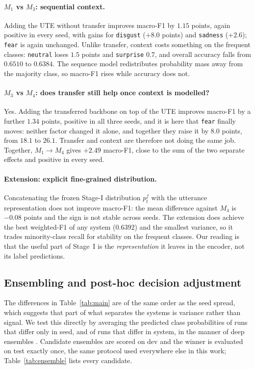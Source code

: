 \documentclass[sigconf,nonacm]{acmart}
\begin{document}
\paragraph{$M_1$ vs $M_3$: sequential context.}
Adding the UTE without transfer improves macro-F1 by $1.15$ points, again positive in every
seed, with gains for \texttt{disgust} ($+8.0$ points) and \texttt{sadness} ($+2.6$);
\texttt{fear} is again unchanged. Unlike transfer, context costs something on the
frequent classes: \texttt{neutral} loses $1.5$ points and \texttt{surprise} $0.7$, and
overall accuracy falls from $0.6510$ to $0.6384$. The sequence model redistributes
probability mass away from the majority class, so macro-F1 rises while accuracy does not.

\paragraph{$M_3$ vs $M_4$: does transfer still help once context is modelled?}
Yes. Adding the transferred backbone on top of the UTE improves macro-F1 by a further
$1.34$ points, positive in all three seeds, and it is here that \texttt{fear} finally
moves: neither factor changed it alone, and together they raise it by $8.0$ points, from
$18.1$ to $26.1$. Transfer and context are therefore not doing the same job. Together, $M_1 \rightarrow M_4$ gives $+2.49$ macro-F1,
close to the sum of the two separate effects and positive in every seed.

\paragraph{Extension: explicit fine-grained distribution.}
Concatenating the frozen Stage-I distribution $p^f_t$ with the utterance representation
does not improve macro-F1: the mean difference against $M_4$ is $-0.08$ points and the sign
is not stable across seeds. The extension does achieve the best weighted-F1 of any system
($0.6392$) and the smallest variance, so it trades minority-class recall for stability on
the frequent classes. Our reading is that the useful part of Stage~I is the
\emph{representation} it leaves in the encoder, not its label predictions.

\subsection{Ensembling and post-hoc decision adjustment}


The differences in Table~\ref{tab:main} are of the same order as the seed spread, which
suggests that part of what separates the systems is variance rather than signal. We test
this directly by averaging the predicted class probabilities of runs that differ only in
seed, and of runs that differ in system, in the manner of deep ensembles
\citep{lakshminarayanan2016ensembles}. Candidate ensembles are scored on dev and the
winner is evaluated on test exactly once, the same protocol used everywhere else in this
work; Table~\ref{tab:ensemble} lists every candidate.
\end{document}
